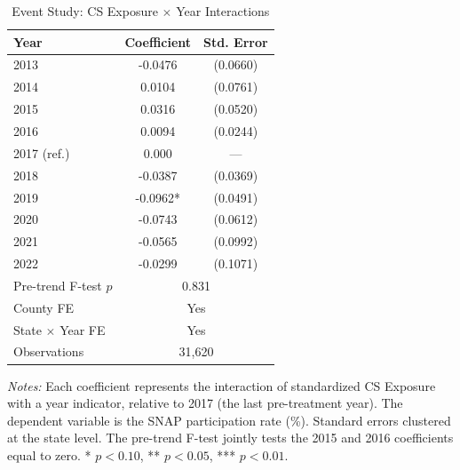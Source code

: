\begin{table}[htbp]
\centering
\caption{Event Study: CS Exposure $\times$ Year Interactions}
\label{tab:event}
\begin{tabular}{lcc}
\toprule
Year & Coefficient & Std. Error \\
\midrule
2013 & -0.0476 & (0.0660) \\
2014 & 0.0104 & (0.0761) \\
2015 & 0.0316 & (0.0520) \\
2016 & 0.0094 & (0.0244) \\
2017 (ref.) & 0.000 & --- \\
2018 & -0.0387 & (0.0369) \\
2019 & -0.0962* & (0.0491) \\
2020 & -0.0743 & (0.0612) \\
2021 & -0.0565 & (0.0992) \\
2022 & -0.0299 & (0.1071) \\
\midrule
Pre-trend F-test $p$ & \multicolumn{2}{c}{0.831} \\
County FE & \multicolumn{2}{c}{Yes} \\
State $\times$ Year FE & \multicolumn{2}{c}{Yes} \\
Observations & \multicolumn{2}{c}{31,620} \\
\bottomrule
\end{tabular}
\begin{tablenotes}[flushleft]
\small
\item \textit{Notes:} Each coefficient represents the interaction of standardized CS Exposure with a year indicator, relative to 2017 (the last pre-treatment year). The dependent variable is the SNAP participation rate (\%). Standard errors clustered at the state level. The pre-trend F-test jointly tests the 2015 and 2016 coefficients equal to zero. * $p<0.10$, ** $p<0.05$, *** $p<0.01$.
\end{tablenotes}
\end{table}

